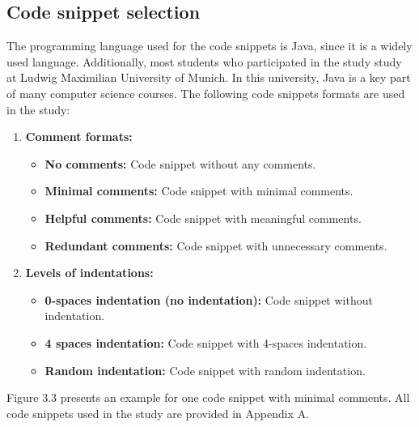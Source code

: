 \subsection{Code snippet selection}

The programming language used for the code snippets is Java, since it is a widely used language.  Additionally, most students who participated in the study study at Ludwig Maximilian University of Munich. In this university, Java is a key part of many computer science courses. The following code snippets formats are used in the study:



\begin{enumerate}
    \item \textbf{Comment formats:}
    \begin{itemize}
        \item \textbf{No comments:} Code snippet without any comments.
        \item \textbf{Minimal comments:} Code snippet with minimal comments.
        \item \textbf{Helpful comments:} Code snippet with meaningful comments.
        \item \textbf{Redundant comments:} Code snippet with unnecessary comments.
    \end{itemize}
    
    \item \textbf{Levels of indentations:}
    \begin{itemize}
        \item \textbf{0-spaces indentation (no indentation):} Code snippet without indentation.
        \item \textbf{4 spaces indentation:} Code snippet with 4-spaces indentation.
        \item \textbf{Random indentation:} Code snippet with random indentation.
    \end{itemize}
\end{enumerate}

Figure 3.3  presents an example for one code snippet with minimal comments. All code snippets used in the study are provided in Appendix A.

